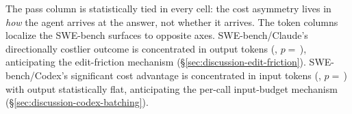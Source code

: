 The pass column is statistically tied in every cell: the cost asymmetry
lives in \emph{how} the agent arrives at the answer, not whether it
arrives. The token columns localize the SWE-bench surfaces to opposite
axes. SWE-bench/Claude's directionally costlier outcome is concentrated
in output tokens
(,
$p=$\,),
anticipating the edit-friction mechanism
(\S\ref{sec:discussion-edit-friction}). SWE-bench/Codex's significant
cost advantage is concentrated in input tokens
(,
$p=$\,)
with output statistically flat, anticipating the per-call input-budget
mechanism (\S\ref{sec:discussion-codex-batching}).

